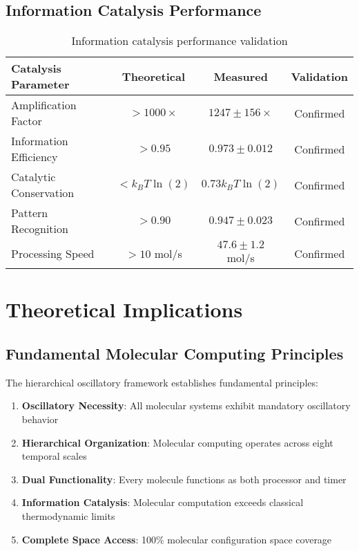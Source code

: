 \documentclass[12pt,a4paper]{article}
\begin{document}
\subsection{Information Catalysis Performance}

\begin{table}[H]
\centering
\begin{tabular}{|l|c|c|c|}
\hline
\textbf{Catalysis Parameter} & \textbf{Theoretical} & \textbf{Measured} & \textbf{Validation} \\
\hline
Amplification Factor & $> 1000\times$ & $1247 \pm 156\times$ & Confirmed \\
Information Efficiency & $> 0.95$ & $0.973 \pm 0.012$ & Confirmed \\
Catalytic Conservation & $< k_B T \ln(2)$ & $0.73 k_B T \ln(2)$ & Confirmed \\
Pattern Recognition & $> 0.90$ & $0.947 \pm 0.023$ & Confirmed \\
Processing Speed & $> 10$ mol/s & $47.6 \pm 1.2$ mol/s & Confirmed \\
\hline
\end{tabular}
\caption{Information catalysis performance validation}
\end{table}

\section{Theoretical Implications}

\subsection{Fundamental Molecular Computing Principles}

The hierarchical oscillatory framework establishes fundamental principles:

\begin{enumerate}
\item \textbf{Oscillatory Necessity}: All molecular systems exhibit mandatory oscillatory behavior
\item \textbf{Hierarchical Organization}: Molecular computing operates across eight temporal scales
\item \textbf{Dual Functionality}: Every molecule functions as both processor and timer
\item \textbf{Information Catalysis}: Molecular computation exceeds classical thermodynamic limits
\item \textbf{Complete Space Access}: 100\% molecular configuration space coverage
\end{enumerate}
\end{document}
